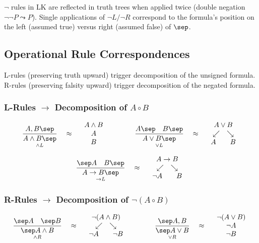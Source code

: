 \documentclass[12pt, letterpaper]{article}
\begin{document}
$\neg$ rules in LK are reflected in truth trees when applied twice (double negation $\neg\neg P \leadsto P$). Single applications of $\neg L / \neg R$ correspond to the formula's position on the left (assumed true) versus right (assumed false) of $\sep$.

\subsection*{Operational Rule Correspondences}

L-rules (preserving truth upward) trigger decomposition of the unsigned formula. R-rules (preserving falsity upward) trigger decomposition of the negated formula.

\subsubsection*{L-Rules $\to$ Decomposition of $A \circ B$}

\[
\frac{A, B \sep}{\underset{\land L}{A \land B \sep}}
\quad \approx \quad
\begin{array}{c} A \land B \\ A \\ B \end{array}
\qquad\qquad
\frac{A \sep \quad B \sep}{\underset{\lor L}{A \lor B \sep}}
\quad \approx \quad
\begin{array}{c} A \lor B \\ \swarrow \quad \searrow \\ A \qquad B \end{array}
\]

\[
\frac{\sep A \quad B \sep}{\underset{\to L}{A \to B \sep}}
\quad \approx \quad
\begin{array}{c} A \to B \\ \swarrow \quad \searrow \\ \neg A \qquad B \end{array}
\]

\subsubsection*{R-Rules $\to$ Decomposition of $\neg(A \circ B)$}

\[
\frac{\sep A \quad \sep B}{\underset{\land R}{\sep A \land B}}
\quad \approx \quad
\begin{array}{c} \neg(A \land B) \\ \swarrow \quad \searrow \\ \neg A \qquad \neg B \end{array}
\qquad\qquad
\frac{\sep A, B}{\underset{\lor R}{\sep A \lor B}}
\quad \approx \quad
\begin{array}{c} \neg(A \lor B) \\ \neg A \\ \neg B \end{array}
\]
\end{document}
